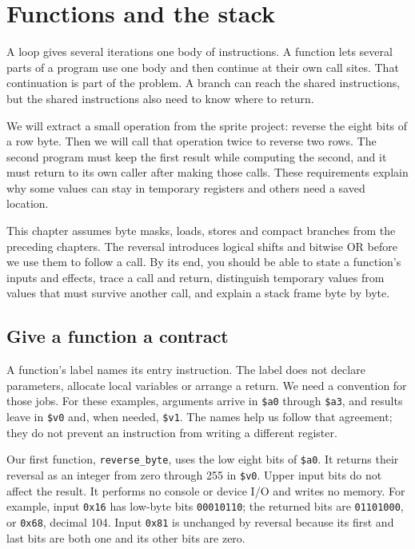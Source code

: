 \chapter{Functions and the stack}
\label{revision:functions-and-stack}

A loop gives several iterations one body of instructions. A function lets several
parts of a program use one body and then continue at their own call sites. That
continuation is part of the problem. A branch can reach the shared instructions,
but the shared instructions also need to know where to return.

We will extract a small operation from the sprite project: reverse the eight bits
of a row byte. Then we will call that operation twice to reverse two rows. The
second program must keep the first result while computing the second, and it must
return to its own caller after making those calls. These requirements explain why
some values can stay in temporary registers and others need a saved location.

This chapter assumes byte masks, loads, stores and compact branches from the
preceding chapters. The reversal introduces logical shifts and bitwise OR before
we use them to follow a call. By its end, you should be able to state a function's
inputs and effects, trace a call and return, distinguish temporary values from
values that must survive another call, and explain a stack frame byte by byte.

\section{Give a function a contract}

A function's label names its entry instruction. The label does not declare
parameters, allocate local variables or arrange a return. We need a convention
for those jobs. For these examples, arguments arrive in \texttt{\$a0} through
\texttt{\$a3}, and results leave in \texttt{\$v0} and, when needed,
\texttt{\$v1}. The names help us follow that agreement; they do not prevent an
instruction from writing a different register.

Our first function, \texttt{reverse\_byte}, uses the low eight bits of
\texttt{\$a0}. It returns their reversal as an integer from zero through 255 in
\texttt{\$v0}. Upper input bits do not affect the result. It performs no console
or device I/O and writes no memory. For example, input \texttt{0x16} has low-byte
bits \texttt{00010110}; the returned bits are \texttt{01101000}, or
\texttt{0x68}, decimal 104. Input \texttt{0x81} is unchanged by reversal because
its first and last bits are both one and its other bits are zero.

